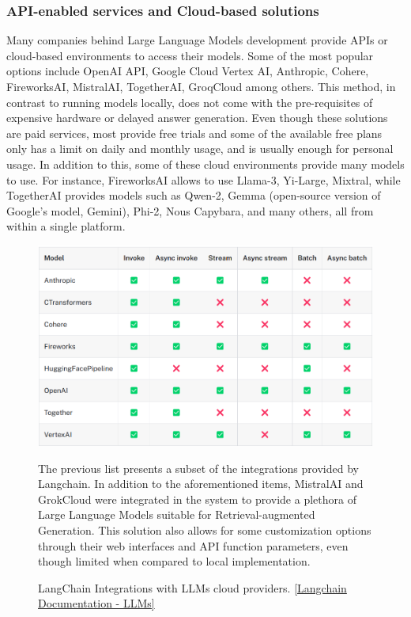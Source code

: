\subsubsection*{API-enabled services and Cloud-based solutions}
Many companies behind Large Language Models development provide APIs or cloud-based environments to access their models. Some of the most popular options include OpenAI API, Google Cloud Vertex AI, Anthropic, Cohere, FireworksAI, MistralAI, TogetherAI, GroqCloud among others.\newline
This method, in contrast to running models locally, does not come with the pre-requisites of expensive hardware or delayed answer generation. Even though these solutions are paid services, most provide free trials and some of the available free plans only has a limit on daily and monthly usage, and is usually enough for personal usage. In addition to this, some of these cloud environments provide many models to use. For instance, FireworksAI allows to use Llama-3, Yi-Large, Mixtral, while TogetherAI provides models such as Qwen-2, Gemma (open-source version of Google's model, Gemini), Phi-2, Nous Capybara, and many others, all from within a single platform.
\begin{figure}[htbp]
    \centering
    \includegraphics[width=\linewidth]{./figures/langchain-llm-integrations.png}
    \caption{LangChain Integrations with LLMs cloud providers. \href{https://python.langchain.com/v0.1/docs/integrations/llms/}{[Langchain Documentation - LLMs]}}
    \begin{flushleft}
        \small The previous list presents a subset of the integrations provided by Langchain. In addition to the aforementioned items, MistralAI and GrokCloud were integrated in the system to provide a plethora of Large Language Models suitable for Retrieval-augmented Generation. This solution also allows for some customization options through their web interfaces and API function parameters, even though limited when compared to local implementation.
    \end{flushleft}
\end{figure}
